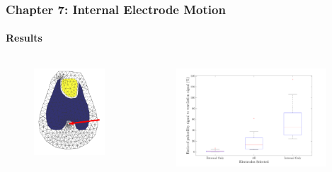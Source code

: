 \documentclass[10pt,    %
    english,            %
    xcolor=table,       %
    envcountsect,        %
    aspectratio=1610
]{beamer}
\begin{document}
\begin{frame}
	\frametitle{Chapter 7: Internal Electrode Motion}
	\framesubtitle{Results}
	\begin{columns}[c]
		\begin{column}{0.25\textwidth}
			\begin{figure}[H]
				\centering
				\includegraphics[width=\textwidth,trim={0cm 0.6cm 0 0cm},clip]{internal_probe_location.png}
			\end{figure}
		\end{column}
		\begin{column}{0.75\textwidth}
			\begin{figure}[H]
				\centering
				\includegraphics[width=0.95\textwidth,trim={0cm 0.6cm 0 0cm},clip]{amplitude_ratio.pdf}
			\end{figure}
		\end{column}
	\end{columns}
\end{frame}
\end{document}
